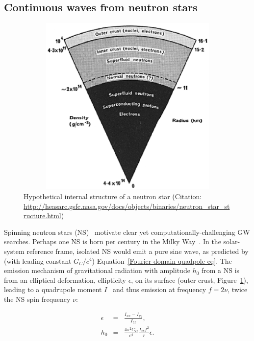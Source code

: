         \subsection{Continuous waves from neutron stars}
        \label{continuous_waves}

	\begin{figure}
	\begin{center}
	\includegraphics[height=90mm, width=120mm]{neutron_star_structure.eps}
	\caption{Hypothetical internal structure of a neutron star (Citation: \url{http://heasarc.gsfc.nasa.gov/docs/objects/binaries/neutron_star_structure.html})} 
	\label{neutron_star_structure}
	\end{center}
	\end{figure}


Spinning neutron stars (NS)~\cite{Prix2006} motivate clear yet computationally-challenging GW searches.
Perhaps one NS is born per century in the Milky Way~\cite{NarayanOstriker1990}.
In the solar-system reference frame, isolated NS would emit a pure sine wave, as predicted by (with leading constant $G_C/c^4$) Equation~\ref{Fourier-domain-quadpole-eq}.
        The emission mechanism of gravitational radiation with amplitude $h_0$ from a NS is from an elliptical deformation, ellipticity $\epsilon$, on its surface (outer crust, Figure~\ref{neutron_star_structure}), leading to a quadrupole moment $I$~\cite{Zimmermann1979,LSCPulsar2006} and thus emission at frequency $f = 2\nu$, twice the NS spin frequency $\nu$:

        \begin{eqnarray}
        \epsilon &=& \frac{I_{xx} - I_{yy}}{I_{zz}}, \\
        h_0 &=& \frac{4 \pi^2 G_C}{c^4} \frac{I_{zz} f^2}{r} \epsilon.
        \end{eqnarray}

